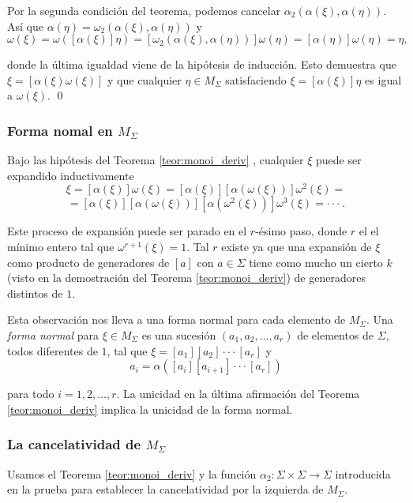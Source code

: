 \documentclass[12pt]{article}
\theoremstyle{definition}
\begin{document}
Por la segunda condición del teorema, podemos cancelar $\alpha_2(\alpha(\xi),\alpha(\eta))$. Así que $\alpha(\eta) = \omega_2(\alpha(\xi),\alpha(\eta))$ y 
$$\omega(\xi) = \omega([\alpha(\xi)]\eta) = [\omega_2(\alpha(\xi),\alpha(\eta))]\omega(\eta)=[\alpha(\eta)]\omega(\eta) = \eta,$$

donde la última igualdad viene de la hipótesis de inducción. Esto demuestra que $\xi = [\alpha(\xi)\omega(\xi)]$ y que cualquier $\eta\in M_\Sigma$ satisfaciendo $\xi = [\alpha(\xi)]\eta$ es igual a $\omega(\xi)$. \qed








\subsubsection{Forma nomal en $M_\Sigma$}

Bajo las hipótesis del Teorema \ref{teor:monoi_deriv} , cualquier $\xi$ puede ser expandido inductivamente
$$\xi=[\alpha(\xi)]\omega(\xi)=[\alpha(\xi)][\alpha(\omega(\xi))]\omega^2(\xi)=$$
$$=[\alpha(\xi)][\alpha(\omega(\xi))][\alpha(\omega^2(\xi))]\omega^3(\xi)=\cdot\cdot\cdot\ .$$

Este proceso de expansión puede ser parado en el $r$-ésimo paso, donde $r$ el el mínimo entero tal que $\omega^{r+1}(\xi)=1$. Tal $r$ existe ya que una expansión de $\xi$ como producto de  generadores de $[a]$ con $a\in\Sigma$ tiene como mucho un cierto $k$ (visto en la demostración del Teorema \ref{teor:monoi_deriv}) de generadores distintos de $1$.

Esta observación nos lleva a una forma normal para cada elemento de $M_\Sigma$. Una \textit{forma normal} para $\xi\in M_\Sigma$ es una sucesión $(a_1,a_2,...,a_r)$ de elementos de $\Sigma$, todos diferentes de $1$, tal que $\xi=[a_1][a_2]\cdot\cdot\cdot[a_r]$ y 
$$a_i=\alpha([a_i][a_{i+1}]\cdot\cdot\cdot[a_r])$$

para todo $i=1,2,...,r$. La unicidad en la última afirmación del Teorema \ref{teor:monoi_deriv} implica la unicidad de la forma normal.


\subsubsection{La cancelatividad de $M_\Sigma$}

Usamos el Teorema \ref{teor:monoi_deriv} y la función $\alpha_2:\Sigma\times\Sigma\rightarrow\Sigma$ introducida en la prueba para establecer la cancelatividad por la izquierda de $M_\Sigma$.
\end{document}
